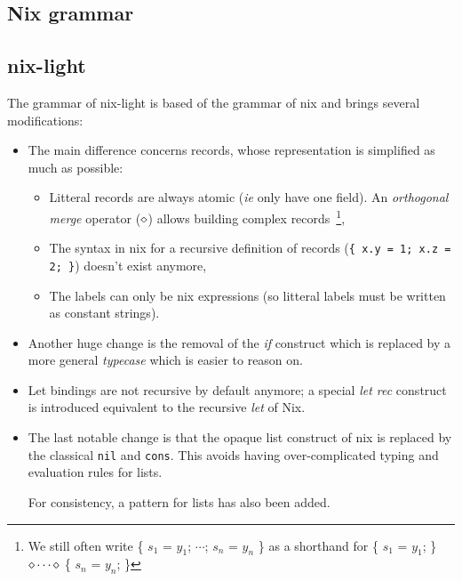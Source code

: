 \subsection{Nix grammar}
\label{sec:nix-grammar}


\subsection{nix-light}
\label{sec:nix-light-grammar}

The grammar of nix-light is based of the grammar of nix and brings several
modifications:
\begin{itemize}
  \item The main difference concerns records, whose representation is simplified as
    much as possible:

    \begin{itemize}
      \item Litteral records are always atomic (\emph{ie} only have one field). An
        \emph{orthogonal merge} operator ($\diamond$) allows building complex
        records~\footnote{We still often write \{ $s_1$ = $y_1$; $\cdots{}$;
        $s_n$ = $y_n$ \} as a shorthand for \{ $s_1$ = $y_1$; \} $\diamond
        \cdots{} \diamond$ \{ $s_n$ = $y_n$; \}},

      \item The syntax in nix for a recursive definition of records (\texttt{\{ x.y
        = 1; x.z = 2; \}}) doesn't exist anymore,

      \item The labels can only be nix expressions (so litteral labels must be
        written as constant strings).
    \end{itemize}

  \item Another huge change is the removal of the \emph{if} construct which is
    replaced by a more general \emph{typecase} which is easier to reason on.

  \item Let bindings are not recursive by default anymore; a special \emph{let
    rec} construct is introduced equivalent to the recursive \emph{let} of Nix.

  \item The last notable change is that the opaque list construct of nix is
    replaced by the classical \texttt{nil} and \texttt{cons}.
    This avoids having over-complicated typing and evaluation rules for lists.

    For consistency, a pattern for lists has also been added.
\end{itemize}

